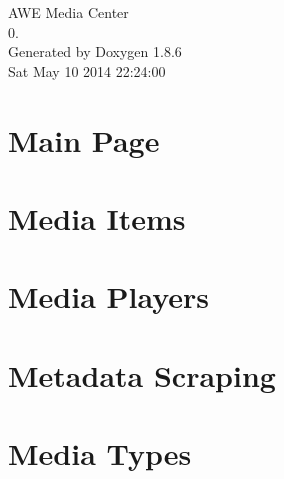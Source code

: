 \documentclass[twoside]{book}
\newcommand{\clearemptydoublepage}{%
  \newpage{\pagestyle{empty}\cleardoublepage}%
}
\begin{document}
\hypersetup{pageanchor=false}
\begin{titlepage}
\vspace*{7cm}
\begin{center}%
{\Large A\-W\-E Media Center \\[1ex]\large 0. }\\
\vspace*{1cm}
{\large Generated by Doxygen 1.8.6}\\
\vspace*{0.5cm}
{\small Sat May 10 2014 22:24:00}\\
\end{center}
\end{titlepage}
\clearemptydoublepage
\tableofcontents
\clearemptydoublepage
{}
\hypersetup{pageanchor=true}

\chapter{Main Page}
\label{index}\hypertarget{index}{}
\chapter{Media Items}
\label{md___users__alex_github__a_w_e_media_center__code_items__r_e_a_d_m_e}
\hypertarget{md___users__alex_github__a_w_e_media_center__code_items__r_e_a_d_m_e}{}

\chapter{Media Players}
\label{md___users__alex_github__a_w_e_media_center__code_player__r_e_a_d_m_e}
\hypertarget{md___users__alex_github__a_w_e_media_center__code_player__r_e_a_d_m_e}{}

\chapter{Metadata Scraping}
\label{md___users__alex_github__a_w_e_media_center__code_scraper__r_e_a_d_m_e}
\hypertarget{md___users__alex_github__a_w_e_media_center__code_scraper__r_e_a_d_m_e}{}

\chapter{Media Types}
\label{md___users__alex_github__a_w_e_media_center__code_type__r_e_a_d_m_e}
\hypertarget{md___users__alex_github__a_w_e_media_center__code_type__r_e_a_d_m_e}{}

\end{document}
